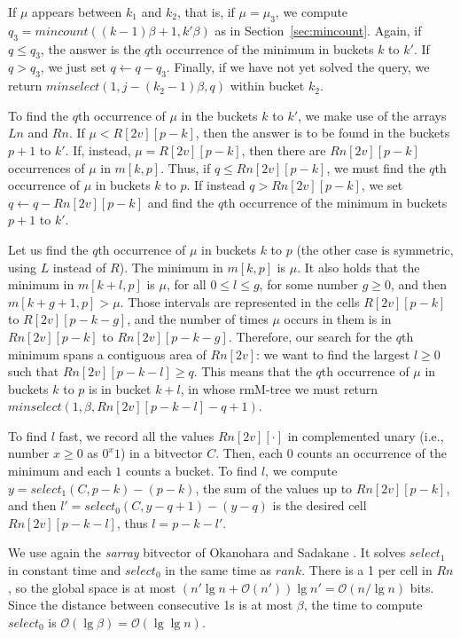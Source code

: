 \documentclass[11pt]{article}
\renewcommand{\log}{\lg}
\newcommand{\0}{\mathit{0}}
\newcommand{\1}{\mathit{1}}
\newcommand{\rank}{\mathit{rank}}
\newcommand{\select}{\mathit{select}}
\newcommand{\mincount}{\mathit{mincount}}
\newcommand{\minselect}{\mathit{minselect}}
\newcommand{\Oh}[1]{\mathcal{O}\!\left(#1\right)}
\begin{document}
If $\mu$ appears between $k_1$ and $k_2$, that is, if $\mu=\mu_3$, we compute
$q_3 = \mincount((k-1)\beta+1,k'\beta)$ as in Section~\ref{sec:mincount}. Again,
if $q \le q_3$, the answer is the $q$th occurrence of the
minimum in buckets $k$ to $k'$. If $q > q_3$, we just set $q \leftarrow q-q_3$.
Finally, if we have not yet solved the query, we return
$\minselect(1,j - (k_2-1)\beta,q)$ within bucket $k_2$.

To find the $q$th occurrence of $\mu$ in the buckets $k$ to $k'$, we make use
of the arrays $Ln$ and $Rn$. If $\mu < R[2v][p-k]$, then the answer is to be
found in the buckets $p+1$ to $k'$. If, instead, $\mu = R[2v][p-k]$, then there
are $Rn[2v][p-k]$ occurrences of $\mu$ in $m[k,p]$. Thus, if $q\le Rn[2v][p-k]$,
we must find the $q$th occurrence of $\mu$ in buckets $k$ to $p$. If instead
$q > Rn[2v][p-k]$, we set $q \leftarrow q- Rn[2v][p-k]$ and find the $q$th
occurrence of the minimum in buckets $p+1$ to $k'$.

Let us find the $q$th occurrence of $\mu$ in buckets $k$ to $p$ (the other case
is symmetric, using $L$ instead of $R$). The minimum in $m[k,p]$ is $\mu$. It
also holds that the minimum in $m[k+l,p]$ is $\mu$, for all $0 \le l \le g$,
for some number $g \ge 0$, and then $m[k+g+1,p] > \mu$. Those intervals are
represented in the cells $R[2v][p-k]$ to $R[2v][p-k-g]$, and the number of times
$\mu$ occurs in them is in $Rn[2v][p-k]$ to $Rn[2v][p-k-g]$. Therefore, our 
search for the $q$th minimum spans a contiguous area of $Rn[2v]$: we want
to find the largest $l \ge 0$ such that $Rn[2v][p-k-l] \ge q$. This means
that the $q$th occurrence of $\mu$ in buckets $k$ to $p$ is in bucket
$k+l$, in whose rmM-tree we must return $\minselect(1,\beta,Rn[2v][p-k-l]-q+1)$.

To find $l$ fast, we record all the values $Rn[2v][\cdot]$ in 
complemented unary (i.e., number $x\ge 0$ as $0^x1$) in a bitvector $C$. Then,
each $0$ counts an occurrence of the minimum and each $1$ counts a bucket. 
To find $l$, we compute
$y=\select_1(C,p-k)-(p-k)$, the sum of the values up to $Rn[2v][p-k]$, and then
$l'=\select_0(C,y-q+1)-(y-q)$ is the desired cell $Rn[2v][p-k-l]$, thus 
$l=p-k-l'$.

We use again the \emph{sarray} bitvector of Okanohara and Sadakane \cite{OS07}.
It solves $\select_1$ in constant time and $\select_0$ in the same time as
$\rank$.  There is a 1 per cell in $Rn$, so the global space is at most $(n'\log
n + \Oh{n'})\log n' = \Oh{n/\log n}$ bits.  Since the distance between
consecutive 1s is at most $\beta$, the time to compute $\select_0$ is
$\Oh{\log\beta}=\Oh{\log\log n}$.
\end{document}
